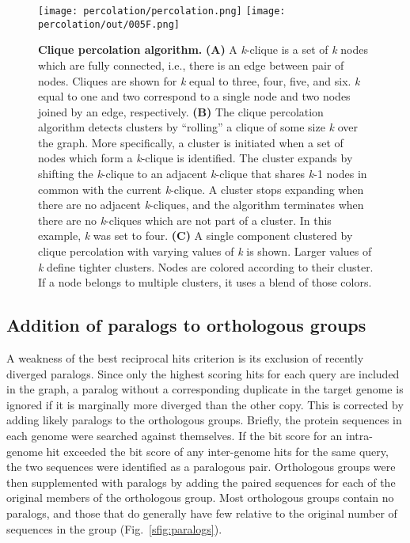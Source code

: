 \documentclass[10pt,letterpaper]{article}
\begin{document}
\begin{figure}[h!]
\texttt{[image: percolation/percolation.png]}
\texttt{[image: percolation/out/005F.png]}
\centering
\caption{\textbf{Clique percolation algorithm.}
\textbf{(A)} A \textit{k}-clique is a set of \textit{k} nodes which are fully connected, i.e., there is an edge between pair of nodes. Cliques are shown for \textit{k} equal to three, four, five, and six. \textit{k} equal to one and two correspond to a single node and two nodes joined by an edge, respectively. \textbf{(B)} The clique percolation algorithm detects clusters by “rolling” a clique of some size \textit{k} over the graph. More specifically, a cluster is initiated when a set of nodes which form a \textit{k}-clique is identified. The cluster expands by shifting the \textit{k}-clique to an adjacent \textit{k}-clique that shares \textit{k}-1 nodes in common with the current \textit{k}-clique. A cluster stops expanding when there are no adjacent \textit{k}-cliques, and the algorithm terminates when there are no \textit{k}-cliques which are not part of a cluster. In this example, \textit{k} was set to four. \textbf{(C)} A single component clustered by clique percolation with varying values of \textit{k} is shown. Larger values of \textit{k} define tighter clusters. Nodes are colored according to their cluster. If a node belongs to multiple clusters, it uses a blend of those colors.}
\label{fig:percolation}
\end{figure}

\subsection*{Addition of paralogs to orthologous groups}
A weakness of the best reciprocal hits criterion is its exclusion of recently diverged paralogs. Since only the highest scoring hits for each query are included in the graph, a paralog without a corresponding duplicate in the target genome is ignored if it is marginally more diverged than the other copy. This is corrected by adding likely paralogs to the orthologous groups. Briefly, the protein sequences in each genome were searched against themselves. If the bit score for an intra-genome hit exceeded the bit score of any inter-genome hits for the same query, the two sequences were identified as a paralogous pair. Orthologous groups were then supplemented with paralogs by adding the paired sequences for each of the original members of the orthologous group. Most orthologous groups contain no paralogs, and those that do generally have few relative to the original number of sequences in the group (Fig.~\ref{sfig:paralogs}).
\end{document}
